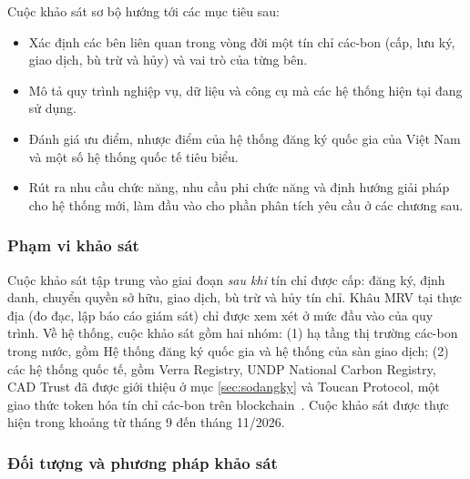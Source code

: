 Cuộc khảo sát sơ bộ hướng tới các mục tiêu sau:
\begin{itemize}
    \item Xác định các bên liên quan trong vòng đời một tín chỉ các-bon (cấp, lưu ký, giao dịch, bù trừ và hủy) và vai trò của từng bên.
    \item Mô tả quy trình nghiệp vụ, dữ liệu và công cụ mà các hệ thống hiện tại đang sử dụng.
    \item Đánh giá ưu điểm, nhược điểm của hệ thống đăng ký quốc gia của Việt Nam và một số hệ thống quốc tế tiêu biểu.
    \item Rút ra nhu cầu chức năng, nhu cầu phi chức năng và định hướng giải pháp cho hệ thống mới, làm đầu vào cho phần phân tích yêu cầu ở các chương sau.
\end{itemize}

\subsubsection*{Phạm vi khảo sát}

Cuộc khảo sát tập trung vào giai đoạn \emph{sau khi} tín chỉ được cấp: đăng ký, định danh, chuyển quyền sở hữu, giao dịch, bù trừ và hủy tín chỉ. Khâu MRV tại thực địa (đo đạc, lập báo cáo giám sát) chỉ được xem xét ở mức đầu vào của quy trình. Về hệ thống, cuộc khảo sát gồm hai nhóm: (1) hạ tầng thị trường các-bon trong nước, gồm Hệ thống đăng ký quốc gia và hệ thống của sàn giao dịch; (2) các hệ thống quốc tế, gồm Verra Registry, UNDP National Carbon Registry, CAD Trust đã được giới thiệu ở mục \ref{sec:sodangky} và Toucan Protocol, một giao thức token hóa tín chỉ các-bon trên blockchain~\cite{toucan2025docs}. Cuộc khảo sát được thực hiện trong khoảng từ tháng 9 đến tháng 11/2026.

\subsubsection*{Đối tượng và phương pháp khảo sát}
\label{subsubsec:ks-phuongphap}


